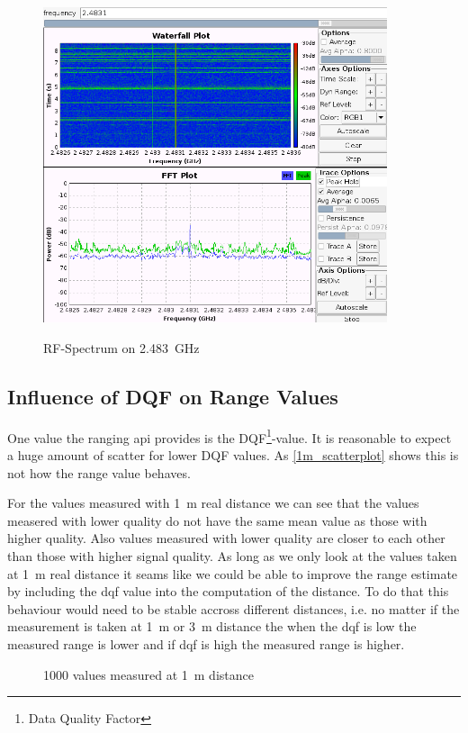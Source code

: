 \begin{figure}[H]
	\centering
\includegraphics[width=0.9\textwidth]{figures/ranging_0.png}
\label{spectrum2483}
\caption{RF-Spectrum on \SI{2.483}{\giga\hertz}}
\end{figure}


\subsection{Influence of DQF on Range Values}
One value the ranging api provides is the DQF\footnote{Data Quality Factor}-value.
It is reasonable to expect a huge amount of scatter for lower DQF values.
As \autoref{1m_scatterplot} shows this is not how the range value behaves.

For the values measured with \SI{1}{\metre} real distance we can see that the values measered with lower quality do not have the same mean value as those with higher quality.
Also values measured with lower quality are closer to each other than those with higher signal quality.
As long as we only look at the values taken at \SI{1}{\metre} real distance it seams like we could be able to improve the range estimate by including the dqf value into the computation of the distance.
To do that this behaviour would need to be stable accross different distances, i.e. no matter if the measurement is taken at \SI{1}{\metre} or \SI{3}{\metre} distance the when the dqf is low the measured range is lower and if dqf is high the measured range is higher.
\begin{figure}[H]
	\centering
	
	\caption{1000 values measured at \SI{1}{\metre} distance}
	\label{1m_scatterplot}
\end{figure}

